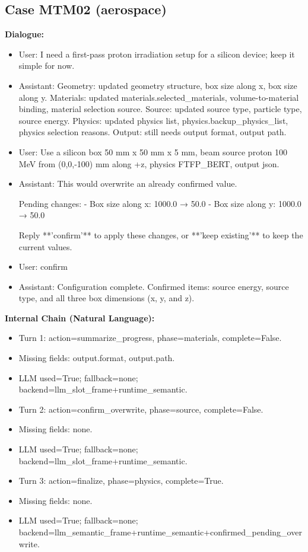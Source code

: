\documentclass[11pt]{ctexart}
\begin{document}
\subsection{Case MTM02 (aerospace)}
\textbf{Dialogue:}
\begin{itemize}
\item User: I need a first-pass proton irradiation setup for a silicon device; keep it simple for now.
\item Assistant: Geometry: updated geometry structure, box size along x, box size along y. Materials: updated materials.selected\_materials, volume-to-material binding, material selection source. Source: updated source type, particle type, source energy. Physics: updated physics list, physics.backup\_physics\_list, physics selection reasons. Output: still needs output format, output path.
\item User: Use a silicon box 50 mm x 50 mm x 5 mm, beam source proton 100 MeV from (0,0,-100) mm along +z, physics FTFP\_BERT, output json.
\item Assistant: This would overwrite an already confirmed value.

Pending changes:
- Box size along x: 1000.0 → 50.0
- Box size along y: 1000.0 → 50.0

Reply **'confirm'** to apply these changes, or **'keep existing'** to keep the current values.
\item User: confirm
\item Assistant: Configuration complete. Confirmed items: source energy, source type, and all three box dimensions (x, y, and z).
\end{itemize}
\textbf{Internal Chain (Natural Language):}
\begin{itemize}
\item Turn 1: action=summarize\_progress, phase=materials, complete=False.
\item Missing fields: output.format, output.path.
\item LLM used=True; fallback=none; backend=llm\_slot\_frame+runtime\_semantic.
\item Turn 2: action=confirm\_overwrite, phase=source, complete=False.
\item Missing fields: none.
\item LLM used=True; fallback=none; backend=llm\_slot\_frame+runtime\_semantic.
\item Turn 3: action=finalize, phase=physics, complete=True.
\item Missing fields: none.
\item LLM used=True; fallback=none; backend=llm\_semantic\_frame+runtime\_semantic+confirmed\_pending\_overwrite.
\end{itemize}
\end{document}
